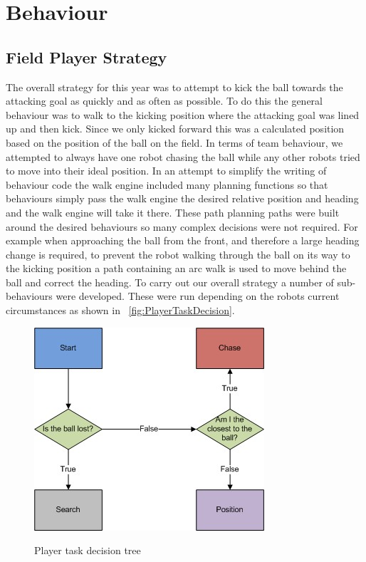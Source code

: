 \section{Behaviour}
\label{Behaviour}
\subsection{Field Player Strategy}
The overall strategy for this year was to attempt to kick the ball towards the attacking goal as quickly and as often as possible. To do this the general behaviour was to walk to the kicking position where the attacking goal was lined up and then kick. Since we only kicked forward this was a calculated position based on the position of the ball on the field. In terms of team behaviour, we attempted to always have one robot chasing the ball while any other robots tried to move into their ideal position. In an attempt to simplify the writing of behaviour code the walk engine included many planning functions so that behaviours simply pass the walk engine the desired relative position and heading and the walk engine will take it there. These path planning paths were built around the desired behaviours so many complex decisions were not required. For example when approaching the ball from the front, and therefore a large heading change is required, to prevent the robot walking through the ball on its way to the kicking position a path containing an arc walk is used to move behind the ball and correct the heading. To carry out our overall strategy a number of sub-behaviours were developed. These were run depending on the robots current circumstances as shown in ~\autoref{fig:PlayerTaskDecision}.

\begin{figure}[htpb]
\begin{center}
   \leavevmode
    \scalebox{0.8} {\includegraphics{figs/FieldPlayerTaskDecision.jpg} }
    \caption{Player task decision tree}
    \label{fig:PlayerTaskDecision}
\end{center}
\end{figure}



